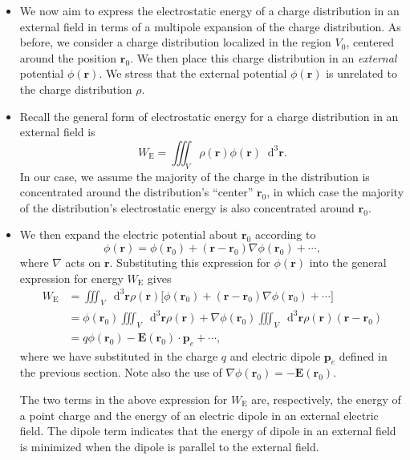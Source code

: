 \documentclass[11pt, a4paper]{article}
\newcommand{\diff}{\mathop{}\!\mathrm{d}} %
\newcommand{\dr}{\diff^{3} \r}  %
\renewcommand{\vec}[1]{\bm{#1}} %
\renewcommand{\r}{\vec{r}}
\newcommand{\E}{\vec{E}} %
\newcommand{\pe}{\vec{p}_{e}}  %
\renewcommand{\grad}{\nabla}
\begin{document}
\begin{itemize}
    \item We now aim to express the electrostatic energy of a charge distribution in an external field in terms of a multipole expansion of the charge distribution. As before, we consider a charge distribution localized in the region $ V_{0} $, centered around the position $ \r_{0} $. We then place this charge distribution in an \textit{external} potential $ \phi(\r) $. We stress that the external potential $ \phi(\r) $ is unrelated to the charge distribution $ \rho $.
	
	\item Recall the general form of electrostatic energy for a charge distribution in an external field is
	\begin{equation*}
		W_{\text{E}} = \iiint_{V} \rho(\r) \phi(\r) \dr.
	\end{equation*}
	In our case, we assume the majority of the charge in the distribution is concentrated around the distribution's ``center'' $ \r_{0} $, in which case the majority of the distribution's electrostatic energy is also concentrated around $ \r_{0} $. 
	
	\item We then expand the electric potential about $ \r_{0} $ according to
	\begin{equation*}
		\phi(\r) = \phi(\r_{0}) + (\r - \r_{0}) \grad \phi(\r_{0}) + \cdots,
	\end{equation*}
    where $ \grad $ acts on $ \r $. Substituting this expression for $ \phi(\r) $ into the general expression for energy $ W_{\text{E}} $ gives
	\begin{align*}
		W_{\text{E}} &= \iiint_{V}\dr \rho(\r)\big[\phi(\r_{0}) + (\r - \r_{0})\grad \phi(\r_{0}) + \cdots \big]\\
		& = \phi(\r_{0}) \iiint_{V} \dr \rho(\r) + \grad \phi(\r_{0}) \iiint_{V} \dr \rho(\r)(\r - \r_{0})\\
		& = q \phi(\r_{0}) - \E(\r_{0}) \cdot \pe + \cdots,
	\end{align*}
    where we have substituted in the charge $ q $ and electric dipole $ \pe $ defined in the previous section. Note also the use of $ \grad\phi(\r_{0}) = - \E(\r_{0}) $. 

    The two terms in the above expression for $ W_{\text{E}} $ are, respectively, the energy of a point charge and the energy of an electric dipole in an external electric field. The dipole term indicates that the energy of dipole in an external field is minimized when the dipole is parallel to the external field.
	
\end{itemize}
\end{document}
